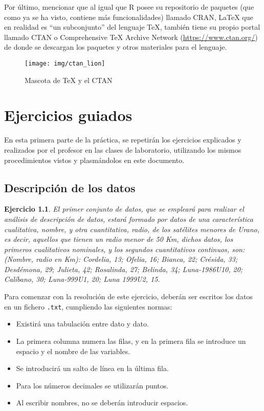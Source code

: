 \documentclass[12pt]{report}\usepackage[]{graphicx}\usepackage[dvipsnames]{xcolor}
\newtheorem{exercise}{Ejercicio}[section]
\begin{document}
			Por último, mencionar que al igual que R posee su repositorio de paquetes (que como ya se ha visto, contiene más funcionalidades) llamado CRAN, \LaTeX{} que en realidad es ``un subconjunto'' del lenguaje \TeX{}, también tiene su propio portal llamado CTAN o Comprehensive \TeX{} Archive Network (\url{https://www.ctan.org/}) de donde se descargan los paquetes y otros materiales para el lenguaje.
			
			\begin{figure}[H]
				\centering
				\texttt{[image: img/ctan\_lion]}
				\caption{Mascota de \TeX{} y el CTAN}
				\label{fig:leon}
			\end{figure}
			
	\chapter{Ejercicios guiados}\pagestyle{fancy}
	
		En esta primera parte de la práctica, se repetirán los ejercicios explicados y realizados por el profesor en las clases de laboratorio, utilizando los mismos procedimientos vistos y plasmándolos en este documento.
	
		\section{Descripción de los datos}
		
			\begin{exercise}
				El primer conjunto de datos, que se empleará para realizar el análisis de descripción de datos, estará formado por datos de una característica cualitativa, nombre, y otra cuantitativa, radio, de los satélites menores de Urano, es decir, aquellos que tienen un radio menor de 50 Km, dichos datos, los primeros cualitativos nominales, y los segundos cuantitativos continuos, son: (Nombre, radio en Km): Cordelia, 13; Ofelia, 16; Bianca, 22; Crésida, 33; Desdémona, 29; Julieta, 42; Rosalinda, 27; Belinda, 34; Luna-1986U10, 20; Calíbano, 30; Luna-999U1, 20; Luna 1999U2, 15.
			\end{exercise}
			
			Para comenzar con la resolución de este ejercicio, deberán ser escritos los datos en un fichero \texttt{.txt}, cumpliendo las siguientes normas:
			
			\begin{itemize}
				\item Existirá una tabulación entre dato y dato. 
				\item La primera columna numera las filas, y en la primera fila se introduce un espacio y el nombre de las variables. 
				\item Se introducirá un salto de línea en la última fila. 
				\item Para los números decimales se utilizarán puntos. 
				\item Al escribir nombres, no se deberán introducir espacios. 
			\end{itemize}
			
\end{document}
